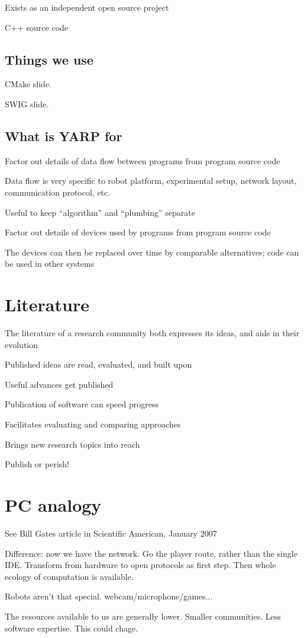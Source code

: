 Exists as an independent open source project

C++ source code


\subsection{Things we use}

CMake slide.

SWIG slide.


\subsection{What is YARP for}


Factor out details of data flow between programs from program source code

Data flow is very specific to robot platform, experimental setup,
network layout, communication protocol, etc.

Useful to keep ``algorithm'' and ``plumbing'' separate

Factor out details of devices used by programs from program source code

The devices can then be replaced over time by comparable alternatives;
code can be used in other systems


\section{Literature}

The literature of a research community both expresses its ideas, and
aids in their evolution

Published ideas are read, evaluated, and built upon

Useful advances get published

Publication of software can speed progress

Facilitates evaluating and comparing approaches

Brings new research topics into reach

Publish or perish!


\section{PC analogy}

See Bill Gates article in Scientific American, January 2007

Difference: now we have the network.  Go the player route, rather than
the single IDE.  Transform from hardware to open protocols as first
step.  Then whole ecology of computation is available.

Robots aren't that special.  webcam/microphone/games...

The resources available to us are generally lower.  Smaller communities.
Less software expertise.  This could chage.


